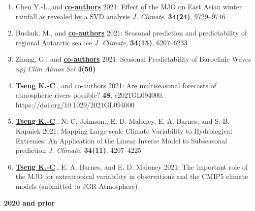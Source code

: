 \documentclass{article}
\begin{document}
\begin{enumerate}[resume]   
	\item Chen Y.-L.,and \normalsize{\bf{\underline{co-authors}}} 2021: Effect of the MJO on East Asian winter rainfall as revealed by a SVD analysis \textit{J. Climate}, \normalsize{\bf{34(24)}}, 9729--9746 \par
	\item Bushuk, M., and \normalsize{\bf{\underline{co-authors}}} 2021: Seasonal prediction and predictability of regional Antarctic sea ice \textit{J. Climate}, \normalsize{\bf{34(15)}}, 6207--6233 \par
	\item Zhang, G., and \normalsize{\bf{\underline{co-authors}}} 2021: Seasonal Predictability of Baroclinic Waves \textit{npj Clim Atmos Sci} \normalsize{\bf{4(50)}}  \par
    \item \normalsize{\bf{\underline{Tseng K.-C}}}., and co-authors 2021: Are multiseasonal forecasts of atmospheric rivers possible? \normalsize{\bf{48}}, e2021GL094000. https://doi.org/10.1029/2021GL094000\par
	\item \normalsize{\bf{\underline{Tseng K.-C}}}., N. C. Johnson., E. D. Maloney, E. A. Barnes, and S. B. Kapnick 2021: Mapping Large-scale Climate Variability to Hydrological Extremes: An Application of the Linear Inverse Model to Subseasonal prediction \textit{J. Climate}, \normalsize{\bf{34(11)}}, 4207--4225 \par
	\item \normalsize{\bf{\underline{Tseng K.-C}}}., E. A. Barnes, and E. D. Maloney 2021: The important role of the MJO for extratropical variability in observations and the CMIP5 climate models (submitted to JGR-Atmosphere)  \par 
	 \end{enumerate}
\normalsize{\bf{2020} and prior} 
\end{document}

